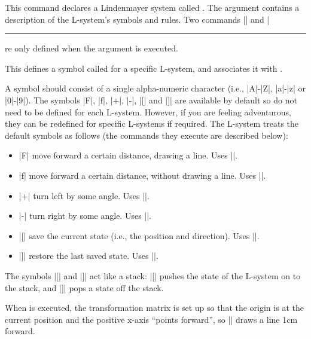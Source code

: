 \begin{command}{\pgfdeclarelindenmayersystem{}}
    This command declares a Lindenmayer system called . The
     argument contains a description of the L-system's
    symbols and rules. Two commands |\symbol| and |\rule| are only defined when
    the  argument is executed.

    \begin{command}{\symbol{}}
        This defines a symbol called  for a specific L-system,
        and associates it with .

        A symbol should consist of a single alpha-numeric character (i.e.,
        |A|-|Z|, |a|-|z| or |0|-|9|). The symbols |F|, |f|, |+|, |-|, |[| and
        |]| are available by default so do not need to be defined for each
        L-system. However, if you are feeling adventurous, they can be
        redefined for specific L-systems if required. The L-system treats the
        default symbols as follows (the commands they execute are described
        below):
        \begin{itemize}
            \item |F| move forward a certain distance, drawing a line. Uses
                |\pgflsystemdrawforward|.
            \item |f| move forward a certain distance, without drawing a line.
                Uses |\pgflsystemmoveforward|.
            \item |+| turn left by some angle. Uses |\pgflsystemturnleft|.
            \item |-| turn right by some angle. Uses |\pgflsystemturnright|.
            \item |[| save the current state (i.e., the position and
                direction). Uses |\pgflsystemsavestate|.
            \item |]| restore the last saved state. Uses
                |\pgflsystemrestorestate|.
        \end{itemize}

        The symbols |[| and |]| act like a stack: |[| pushes the state of the
        L-system on to the stack, and |]| pops a state off the stack.

        When  is executed, the transformation matrix is set up so
        that the origin is at the current position and the positive x-axis
        ``points forward'', so |\pgfpathlineto{\pgfpoint{1cm}{0cm}}| draws a
        line 1cm forward.


\end{command}
\end{command}
